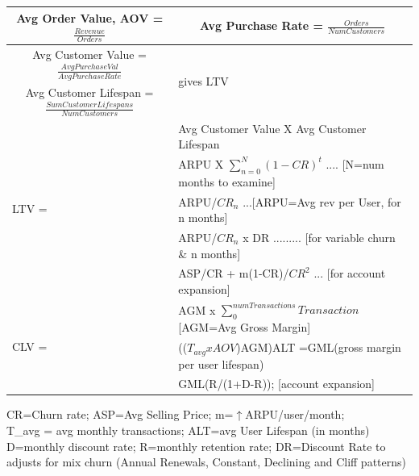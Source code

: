 \documentclass{beamer}
\begin{document}
\begingroup
\small

\begin{frame}

	\begin{table}
		\begin{tabular}{llll}
			\multicolumn{2}{c}{Avg Order Value, AOV = $\frac{Revenue}{Orders}$};
			& \multicolumn{2}{c}{Avg Purchase Rate = $\frac{Orders}{NumCustomers}$} 
			\\ \hline
			\multicolumn{3}{c}{Avg Customer Value = $\frac{Avg Purchase Val}{Avg Purchase Rate}$}
			& \multirow{2}{*}{gives LTV}
			\\ %
			\multicolumn{3}{c}{Avg Customer Lifespan = $\frac{Sum Customer Lifespans}{Num Customers}$}
			& \\ \hline
			\multirow{5}{*}{LTV = }
			& \multicolumn{3}{l}{Avg Customer Value X Avg Customer Lifespan}
			\\ 
			& \multicolumn{3}{l}{ARPU X $\sum_{n=0}^{N}(1-CR)^t$ .... [N=num months to examine]}
			\\
			& \multicolumn{3}{l}{ARPU/$CR_n$ ...[ARPU=Avg rev per User, for n months]}
			\\
			& \multicolumn{3}{l}{ARPU/$CR_n$ x DR ......... [for variable churn \& n months]}
			\\
			& \multicolumn{3}{l}{ASP/CR + m(1-CR)/$CR^2$ ... [for account expansion]}
			\\ \hline
			\multirow{3}{*}{CLV = }
			& \multicolumn{3}{l}{AGM x $\sum_{0}^{numTransactions} Transaction$ [AGM=Avg Gross Margin]}
			\\
			& \multicolumn{3}{l}{(($T_{avg}xAOV$)AGM)ALT =GML(gross margin per user lifespan)}
			\\
			& \multicolumn{3}{l}{GML(R/(1+D-R)); [account expansion]}
			\\
			\hline
		\end{tabular}
	\end{table}


CR=Churn rate; ASP=Avg Selling Price; m=$\uparrow$ARPU/user/month;\\
T\_avg = avg monthly transactions; ALT=avg User Lifespan (in months)\\
D=monthly discount rate; R=monthly retention rate; 
DR=Discount Rate to adjusts for mix churn (Annual Renewals, Constant, Declining and Cliff patterns)

\end{frame}

\endgroup
\end{document}
